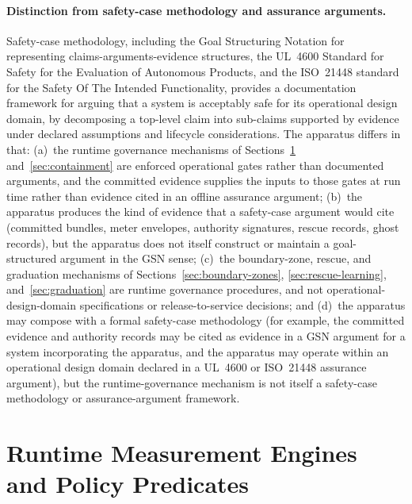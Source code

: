 \documentclass[a4paper,12pt]{article}
\begin{document}
\paragraph{Distinction from safety-case methodology and assurance
arguments.}
Safety-case methodology, including the Goal Structuring Notation
for representing claims-arguments-evidence structures, the UL~4600
Standard for Safety for the Evaluation of Autonomous Products, and
the ISO~21448 standard for the Safety Of The Intended
Functionality, provides a documentation framework for arguing that
a system is acceptably safe for its operational design domain, by
decomposing a top-level claim into sub-claims supported by
evidence under declared assumptions and lifecycle considerations.
The apparatus differs in that: (a)~the runtime governance
mechanisms of Sections~\ref{sec:measurement-engine}
and~\ref{sec:containment} are enforced operational gates rather
than documented arguments, and the committed evidence supplies
the inputs to those gates at run time rather than evidence cited
in an offline assurance argument; (b)~the apparatus produces the
kind of evidence that a safety-case argument would cite (committed
bundles, meter envelopes, authority signatures, rescue records,
ghost records), but the apparatus does not itself construct or
maintain a goal-structured argument in the GSN sense;
(c)~the boundary-zone, rescue, and graduation mechanisms of
Sections~\ref{sec:boundary-zones}, \ref{sec:rescue-learning},
and~\ref{sec:graduation} are runtime governance procedures, and
not operational-design-domain specifications or release-to-service
decisions; and (d)~the apparatus may compose with a formal
safety-case methodology (for example, the committed evidence and
authority records may be cited as evidence in a GSN argument for
a system incorporating the apparatus, and the apparatus may
operate within an operational design domain declared in a
UL~4600 or ISO~21448 assurance argument), but the
runtime-governance mechanism is not itself a safety-case
methodology or assurance-argument framework.

\section{Runtime Measurement Engines and Policy Predicates}
\label{sec:measurement-engine}

\end{document}
